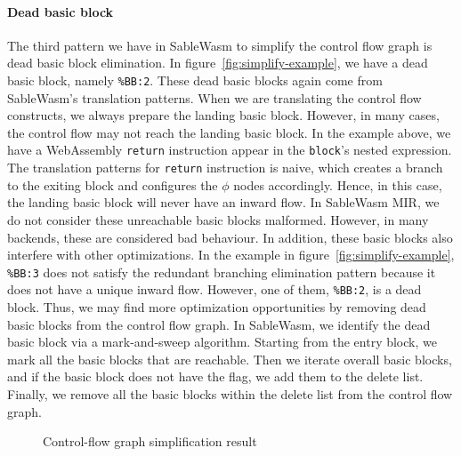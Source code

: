 \paragraph{Dead basic block}
The third pattern we have in SableWasm to simplify the control flow graph is
dead basic block elimination. In figure~\ref{fig:simplify-example}, we have a
dead basic block, namely \texttt{\%BB:2}. These dead basic blocks again come
from SableWasm's translation patterns. When we are translating the control flow
constructs, we always prepare the landing basic block. However, in many cases,
the control flow may not reach the landing basic block. In the example above,
we have a WebAssembly \texttt{return} instruction appear in the \texttt{block}'s
nested expression. The translation patterns for \texttt{return} instruction is
naive, which creates a branch to the exiting block and configures the $\phi$
nodes accordingly. Hence, in this case, the landing basic block will never have
an inward flow. In SableWasm MIR, we do not consider these unreachable basic
blocks malformed. However, in many backends, these are considered bad behaviour.
In addition, these basic blocks also interfere with other optimizations. In the
example in figure~\ref{fig:simplify-example}, \texttt{\%BB:3} does not satisfy
the redundant branching elimination pattern because it does not have a unique
inward flow. However, one of them, \texttt{\%BB:2}, is a dead block. Thus, we
may find more optimization opportunities by removing dead basic blocks from the
control flow graph. In SableWasm, we identify the dead basic block via
a mark-and-sweep algorithm. Starting from the entry block, we mark all the basic
blocks that are reachable. Then we iterate overall basic blocks, and if the
basic block does not have the flag, we add them to the delete list. Finally, we
remove all the basic blocks within the delete list from the control flow graph.

\begin{figure}
    
    \caption{Control-flow graph simplification result}
    \label{fig:simplify-result}
\end{figure}

